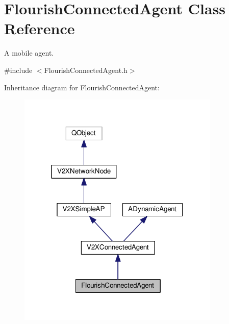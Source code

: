 \hypertarget{classFlourishConnectedAgent}{}\section{Flourish\+Connected\+Agent Class Reference}
\label{classFlourishConnectedAgent}


A mobile agent.  




{\ttfamily \#include $<$Flourish\+Connected\+Agent.\+h$>$}



Inheritance diagram for Flourish\+Connected\+Agent\+:\nopagebreak
\begin{figure}[H]
\begin{center}
\leavevmode
\includegraphics[width=273pt]{classFlourishConnectedAgent__inherit__graph}
\end{center}
\end{figure}


